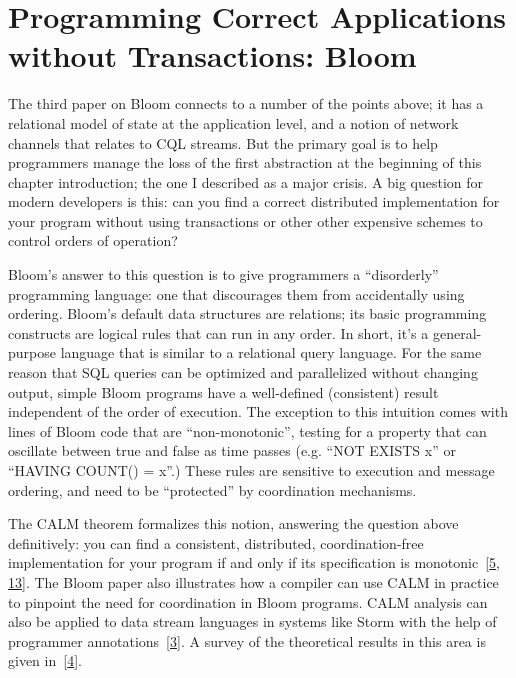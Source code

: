 \documentclass[b5paper,11pt,twoside,openright]{book}
\newcommand\Section[2]{
  \hypertarget{#1}{
    \section{#2}\label{#1}
  }
}
\begin{document}
\Section{programming-correct-applications-without-transactions-bloom}{%
Programming Correct Applications without Transactions: Bloom
}

The third paper on Bloom connects to a number of the points above; it
has a relational model of state at the application level, and a notion
of network channels that relates to CQL streams. But the primary goal is
to help programmers manage the loss of the first abstraction at the
beginning of this chapter introduction; the one I described as a major
crisis. A big question for modern developers is this: can you find a
correct distributed implementation for your program without using
transactions or other other expensive schemes to control orders of
operation?

Bloom's answer to this question is to give programmers a ``disorderly''
programming language: one that discourages them from accidentally using
ordering. Bloom's default data structures are relations; its basic
programming constructs are logical rules that can run in any order. In
short, it's a general-purpose language that is similar to a relational
query language. For the same reason that SQL queries can be optimized
and parallelized without changing output, simple Bloom programs have a
well-defined (consistent) result independent of the order of execution.
The exception to this intuition comes with lines of Bloom code that are
``non-monotonic'', testing for a property that can oscillate between
true and false as time passes (e.g. ``NOT EXISTS x'' or ``HAVING COUNT()
= x''.) These rules are sensitive to execution and message ordering, and
need to be ``protected'' by coordination mechanisms.

The CALM theorem formalizes this notion, answering the question above
definitively: you can find a consistent, distributed, coordination-free
implementation for your program if and only if its specification is
monotonic~{{[}\protect\hyperlink{ref-ameloot2013relational}{5},
  \protect\hyperlink{ref-hellerstein2010declarative}{13}{]}}. The Bloom
paper also illustrates how a compiler can use CALM in practice to
pinpoint the need for coordination in Bloom programs. CALM analysis can
also be applied to data stream languages in systems like Storm with the
help of programmer
annotations~{{[}\protect\hyperlink{ref-alvaro2014blazes}{3}{]}}. A
survey of the theoretical results in this area is given
in~{{[}\protect\hyperlink{ref-ameloot2014declarative}{4}{]}}.
\end{document}
